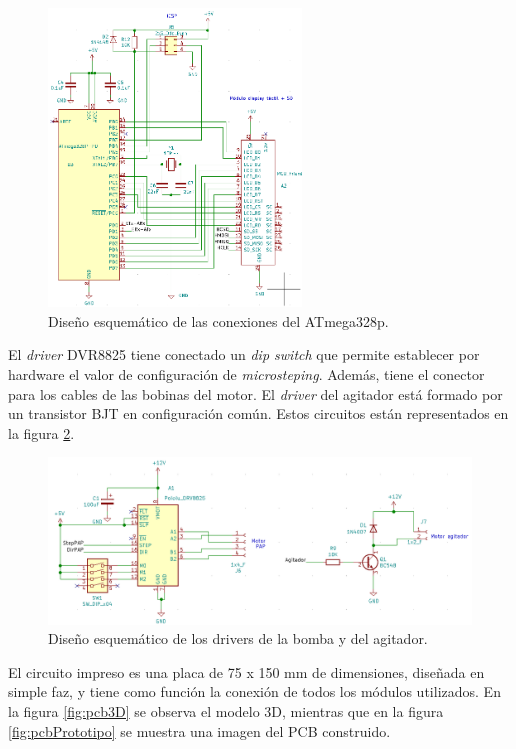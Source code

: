 \begin{figure}[htbp]
	\centering
	\includegraphics[width=0.6\textwidth]{./Figures/esquematicoAtmega.png}
	\caption{Diseño esquemático de las conexiones del ATmega328p.}
	\label{fig:esquematicoAtmega}
\end{figure}

El \textit{driver} DVR8825 tiene conectado un \textit{dip switch} que permite establecer por hardware el valor de configuración de \textit{microsteping}. Además, tiene el conector para los cables de las bobinas del motor. El \textit{driver} del agitador está formado por un transistor BJT en configuración común. Estos circuitos están representados en la figura \ref{fig:esquematicoMotores}.

\begin{figure}[htbp]
	\centering
	\includegraphics[width=1.0\textwidth]{./Figures/esquematicoMotores.png}
	\caption{Diseño esquemático de los drivers de la bomba y del agitador.}
	\label{fig:esquematicoMotores}
\end{figure}

El circuito impreso es una placa de 75 x 150 mm de dimensiones, diseñada en simple faz, y tiene como función la conexión de todos los módulos utilizados. En la figura \ref{fig:pcb3D} se observa el modelo 3D, mientras que en la figura \ref{fig:pcbPrototipo} se muestra una imagen del PCB construido.


